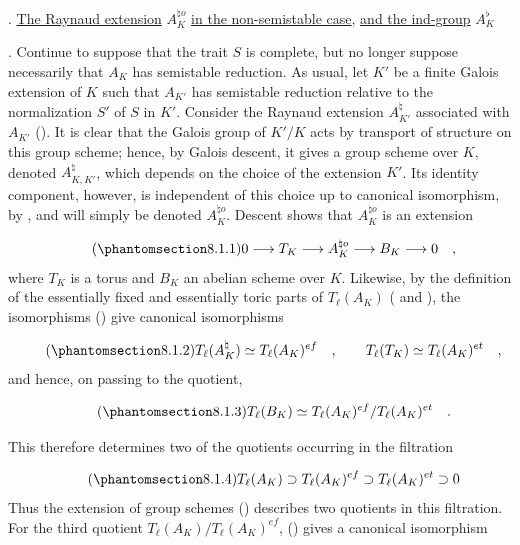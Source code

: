 
\medskip
{}. \underline{The Raynaud extension} $A_K^{\natural o}$ \underline{in the
non-semistable case}, \underline{and the ind-group} $A_K^{\flat}$

\medskip
\noindent
{}. Continue to suppose that the trait $S$ is complete, but no
longer suppose necessarily that $A_K$ has semistable reduction. As
usual, let $K'$ be a finite Galois extension of $K$ such that
$A_{K'}$ has semistable reduction relative to the normalization $S'$
of $S$ in $K'$. Consider the Raynaud extension
$A_{K'}^{\natural}$ associated with $A_{K'}$ (). It is clear
that the Galois group of $K'/K$ acts by transport of structure on
this group scheme; hence, by Galois descent, it gives a group scheme
over $K$, denoted $A_{K,K'}^{\natural}$, which depends on the choice
of the extension $K'$. Its identity component, however, is
independent of this choice up to canonical isomorphism, by ,
and will simply be denoted $A_K^{\natural o}$. Descent shows that
$A_K^{\natural o}$ is an extension

\begin{equation}\tag{\SGARefTarget{sga7.sga7i.eix.n8-1-1}{8.1.1}}
0 \longrightarrow T_K \longrightarrow A_K^{\natural o}
 \longrightarrow B_K \longrightarrow 0 \quad ,
\end{equation}
where $T_K$ is a torus and $B_K$ an abelian scheme over $K$.
Likewise, by the definition of the essentially fixed and essentially
toric parts of $T_{\ell}(A_K)$ ( and ), the isomorphisms
() give canonical isomorphisms

\begin{equation}\tag{\SGARefTarget{sga7.sga7i.eix.n8-1-2}{8.1.2}}
T_{\ell}(A_K^{\natural}) \simeq T_{\ell}(A_K)^{ef} \quad ,
\qquad T_{\ell}(T_K) \simeq T_{\ell}(A_K)^{et} \quad ,
\end{equation}
and hence, on passing to the quotient,

\begin{equation}\tag{\SGARefTarget{sga7.sga7i.eix.n8-1-3}{8.1.3}}
T_{\ell}(B_K) \simeq
T_{\ell}(A_K)^{ef}/T_{\ell}(A_K)^{et} \quad .
\end{equation}

This therefore determines two of the quotients occurring in the
filtration

\begin{equation}\tag{\SGARefTarget{sga7.sga7i.eix.n8-1-4}{8.1.4}}
T_\ell(A_K) \supset T_\ell(A_K)^{ef}
 \supset T_\ell(A_K)^{et} \supset 0
\end{equation}
Thus the extension of group schemes () describes two quotients
in this filtration. For the third quotient
$T_\ell(A_K)/T_\ell(A_K)^{ef}$, () gives a canonical
isomorphism

